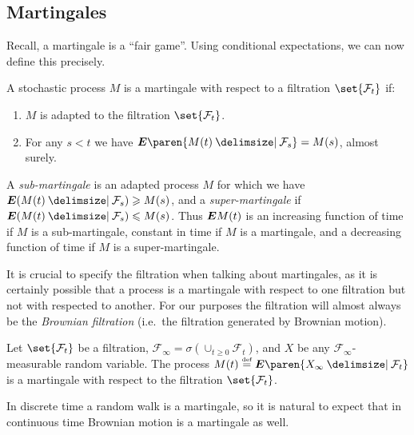 \subsection{Martingales}

Recall, a martingale is a ``fair game''.
Using conditional expectations, we can now define this precisely.

\begin{definition}
  A stochastic process $M$ is a martingale with respect to a filtration $\set{\mathcal F_t}$ if:
  \begin{enumerate}
    \item
       $M$ is adapted to the filtration $\set{\mathcal F_t}$.
    \item
      For any $s < t$ we have $\E\paren{ M(t) \given \mathcal F_s} = M(s)$, almost surely.
  \end{enumerate}
\end{definition}
\begin{remark}
  A \emph{sub-martingale} is an adapted process $M$ for which we have $\E(M(t) \given \mathcal F_s) \geq M(s)$, and a \emph{super-martingale} if $\E( M(t) \given \mathcal F_s) \leq M(s)$.
  Thus $\bm{E} M(t)$ is an increasing function of time if $M$ is a sub-martingale, constant in time if $M$ is a martingale, and a decreasing function of time if $M$ is a super-martingale.
\end{remark}

\begin{remark}
  It is crucial to specify the filtration when talking about martingales, as it is certainly possible that a process is a martingale with respect to one filtration but not with respected to another.
  For our purposes the filtration will almost always be the \emph{Brownian filtration} (i.e.\ the filtration generated by Brownian motion).
\end{remark}

\begin{example}
  Let $\set{\mathcal F_t}$ be a filtration, $\mathcal F_\infty = \sigma( \cup_{t \geq 0} \mathcal F_t )$, and $X$ be any $\mathcal F_\infty$-measurable random variable.
  The process $M(t) \defeq \E\paren{ X_\infty \given \mathcal F_t }$ is a martingale with respect to the filtration $\set{\mathcal F_t}$.
\end{example}


In discrete time a random walk is a martingale, so it is natural to expect that in continuous time Brownian motion is a martingale as well.

